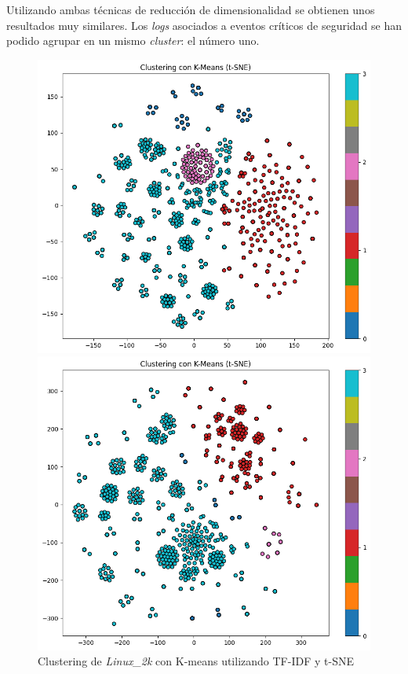 \vspace{-2mm}

Utilizando ambas técnicas de reducción de dimensionalidad se obtienen unos resultados muy similares. Los \textit{logs} asociados a eventos críticos de seguridad se han podido agrupar en un mismo \textit{cluster}: el número uno.

\begin{figure}[H]
    \centering   
    \begin{minipage}{0.4\textwidth}
        \centering
        \includegraphics[width=\linewidth]{imagenes/dataset_02_k-means_t_sne_count_vectorizer.png}
        \caption{Clustering de \textit{Linux\_2k} con K-means utilizando \gls{TF}-\gls{IDF} y \gls{t-SNE}}
        \label{fig:dataset_02_k-means_tsne_tf_idf}
    \end{minipage}
    \hspace{0.1\textwidth}
    \begin{minipage}{0.4\textwidth}
        \centering
        \includegraphics[width=\linewidth]{imagenes/dataset_02_k-means_tsne_tf_idf.png}

\end{minipage}
\end{figure}
